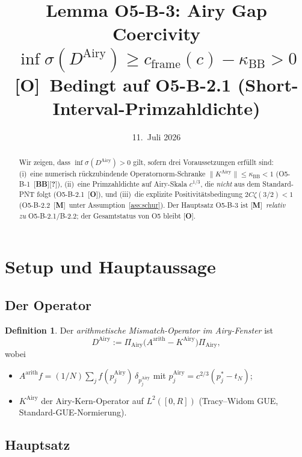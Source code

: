 \documentclass[12pt,a4paper]{amsart}
\newcommand{\statusM}{{\color{green!60!black}[\textbf{M}]}}
\newcommand{\statusO}{{\color{red}[\textbf{O}]}}
\newcommand{\statusBB}{{\color{blue}[\textbf{BB}]}}
\newcommand{\statusQ}{{\color{red}[\textbf{?}]}}
\theoremstyle{definition}
\newtheorem{definition}[theorem]{Definition}
\newcommand{\KAiry}{K^{\mathrm{Airy}}}
\newcommand{\Aarith}{A^{\mathrm{arith}}}
\newcommand{\DAiry}{D^{\mathrm{Airy}}}
\newcommand{\PiAiry}{\Pi_{\mathrm{Airy}}}
\newcommand{\kappaBB}{\kappa_{\mathrm{BB}}}
\newcommand{\cframe}{c_{\mathrm{frame}}}
\newcommand{\norm}[1]{\lVert #1 \rVert}
\begin{document}
\title{Lemma O5-B-3: Airy Gap Coercivity\\
$\inf\sigma(\DAiry) \ge \cframe(c) - \kappaBB > 0$\\
{\normalsize \statusO\ Bedingt auf O5-B-2.1 (Short-Interval-Primzahldichte)}}
\date{11.\ Juli 2026}
\maketitle

\begin{abstract}
Wir zeigen, dass $\inf\sigma(\DAiry) > 0$ gilt, sofern drei Voraussetzungen
erfüllt sind: (i)~eine numerisch rückzubindende Operatornorm-Schranke
$\norm{\KAiry} \le \kappaBB < 1$ (O5-B-1~\statusBB\statusQ),
(ii)~eine Primzahldichte auf Airy-Skala $c^{1/3}$, die \emph{nicht}
aus dem Standard-PNT folgt (O5-B-2.1~\statusO), und
(iii)~die explizite Positivitätsbedingung $2C\zeta(3/2) < 1$
(O5-B-2.2~\statusM\ unter Assumption~\ref{ass:schur}).
Der Hauptsatz O5-B-3 ist \statusM\ \emph{relativ zu} O5-B-2.1/B-2.2;
der Gesamtstatus von O5 bleibt \statusO.
\end{abstract}

\tableofcontents

\section{Setup und Hauptaussage}
\label{sec:setup}

\subsection{Der Operator}

\begin{definition}
Der \emph{arithmetische Mismatch-Operator im Airy-Fenster} ist
\[
  \DAiry := \PiAiry\bigl(\Aarith - \KAiry\bigr)\PiAiry,
\]
wobei
\begin{itemize}
  \item $\Aarith f = (1/N)\sum_j f(p_j^{\mathrm{Airy}})\,\delta_{p_j^{\mathrm{Airy}}}$
    mit $p_j^{\mathrm{Airy}} = c^{2/3}(p_j^* - t_N)$;
  \item $\KAiry$ der Airy-Kern-Operator auf $L^2([0,R])$
    (Tracy--Widom GUE, Standard-GUE-Normierung).
\end{itemize}
\end{definition}

\subsection{Hauptsatz}
\end{document}
